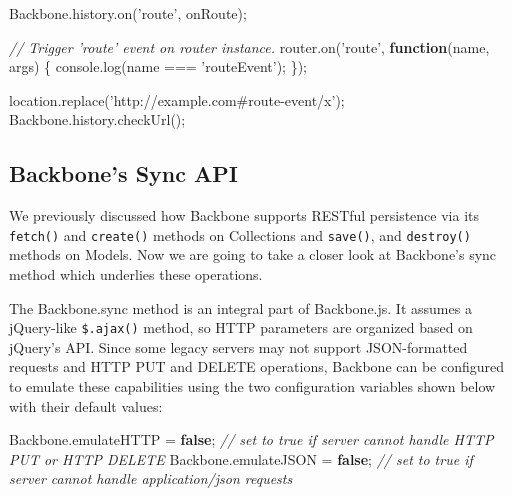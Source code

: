 \documentclass[9pt]{book}
\newenvironment{Shaded}{}{}
\newcommand{\KeywordTok}[1]{\textcolor[rgb]{0.00,0.44,0.13}{\textbf{{#1}}}}
\newcommand{\StringTok}[1]{\textcolor[rgb]{0.25,0.44,0.63}{{#1}}}
\newcommand{\CommentTok}[1]{\textcolor[rgb]{0.38,0.63,0.69}{\textit{{#1}}}}
\newcommand{\OtherTok}[1]{\textcolor[rgb]{0.00,0.44,0.13}{{#1}}}
\newcommand{\FunctionTok}[1]{\textcolor[rgb]{0.02,0.16,0.49}{{#1}}}
\newcommand{\NormalTok}[1]{{#1}}
\begin{document}
\begin{Shaded}
\begin{Highlighting}[]
\OtherTok{Backbone}\NormalTok{.}\OtherTok{history}\NormalTok{.}\FunctionTok{on}\NormalTok{(}\StringTok{'route'}\NormalTok{, onRoute);}

\CommentTok{// Trigger 'route' event on router instance.}
\OtherTok{router}\NormalTok{.}\FunctionTok{on}\NormalTok{(}\StringTok{'route'}\NormalTok{, }\KeywordTok{function}\NormalTok{(name, args) \{}
  \OtherTok{console}\NormalTok{.}\FunctionTok{log}\NormalTok{(name === }\StringTok{'routeEvent'}\NormalTok{); }
\NormalTok{\});}

\OtherTok{location}\NormalTok{.}\FunctionTok{replace}\NormalTok{(}\StringTok{'http://example.com#route-event/x'}\NormalTok{);}
\OtherTok{Backbone}\NormalTok{.}\OtherTok{history}\NormalTok{.}\FunctionTok{checkUrl}\NormalTok{();}
\end{Highlighting}
\end{Shaded}

\subsection{Backbone's Sync API}\label{backbones-sync-api}

We previously discussed how Backbone supports RESTful persistence via
its \texttt{fetch()} and \texttt{create()} methods on Collections and
\texttt{save()}, and \texttt{destroy()} methods on Models. Now we are
going to take a closer look at Backbone's sync method which underlies
these operations.

The Backbone.sync method is an integral part of Backbone.js. It assumes
a jQuery-like \texttt{\$.ajax()} method, so HTTP parameters are
organized based on jQuery's API. Since some legacy servers may not
support JSON-formatted requests and HTTP PUT and DELETE operations,
Backbone can be configured to emulate these capabilities using the two
configuration variables shown below with their default values:

\begin{Shaded}
\begin{Highlighting}[]
\OtherTok{Backbone}\NormalTok{.}\FunctionTok{emulateHTTP} \NormalTok{= }\KeywordTok{false}\NormalTok{; }\CommentTok{// set to true if server cannot handle HTTP PUT or HTTP DELETE}
\OtherTok{Backbone}\NormalTok{.}\FunctionTok{emulateJSON} \NormalTok{= }\KeywordTok{false}\NormalTok{; }\CommentTok{// set to true if server cannot handle application/json requests}
\end{Highlighting}
\end{Shaded}
\end{document}
